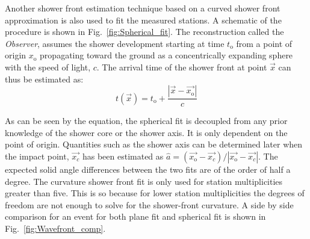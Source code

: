 Another shower front estimation technique based on a curved shower front approximation is also used to fit the measured stations. A schematic of the procedure is shown in Fig.~\ref{fig:Spherical_fit}. The reconstruction called the \textit{Observer}, assumes the shower development starting at time $t_{\text{o}}$ from a point of origin $x_{\text{o}}$ propagating toward the ground as a concentrically expanding sphere with the speed of light, $c$. The arrival time of the shower front at point $\vec{x}$ can thus be estimated as:
\begin{equation}
  t(\vec{x}) = t_{\text{o}} + \frac{|\vec{x}-\vec{x_{\text{o}}}|}{c}
\end{equation}

As can be seen by the equation, the spherical fit is decoupled from any prior knowledge of the shower core or the shower axis. It is only dependent on the point of origin. Quantities such as the shower axis can be determined later when the impact point, $\vec{x_c}$ has been estimated as $ \hat{a} = (\vec{x_{\text{o}}} -\vec{x_c})/ |\vec{x_{\text{o}}}-\vec{x_c}|$. The expected solid angle differences between the two fits are of the order of half a degree. The curvature shower front fit is only used for station multiplicities greater than five. This is so because for lower station multiplicities the degrees of freedom are not enough to solve for the shower-front curvature. A side by side comparison for an event for both plane fit and spherical fit is shown in Fig.~\ref{fig:Wavefront_comp}.

